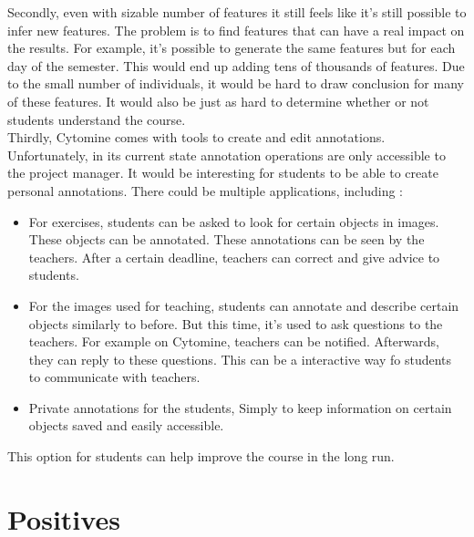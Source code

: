 \documentclass[a4paper,11pt]{report}
\numberwithin{figure}{section} %
\begin{document}
        Secondly, even with sizable number of features it still feels like it's still possible to infer new features.
        The problem is to find features that can have a real impact on the results.
        For example, it's possible to generate the same features but for each day of the semester.
        This would end up adding tens of thousands of features.
        Due to the small number of individuals, it would be hard to draw conclusion for many of these features.
        It would also be just as hard to determine whether or not students understand the course.\\

        Thirdly, Cytomine comes with tools to create and edit annotations.
        Unfortunately, in its current state annotation operations are only accessible to the project manager.
        It would be interesting for students to be able to create personal annotations.
        There could be multiple applications, including :
        \begin{itemize}
            \item[\textbullet] For exercises, students can be asked to look for certain objects in images.
            These objects can be annotated.
            These annotations can be seen by the teachers.
            After a certain deadline, teachers can correct and give advice to students.
            \item[\textbullet] For the images used for teaching, students can annotate and describe certain objects similarly to before.
            But this time, it's used to ask questions to the teachers.
            For example on Cytomine, teachers can be notified.
            Afterwards, they can reply to these questions.
            This can be a interactive way fo students to communicate with teachers.
            \item[\textbullet] Private annotations for the students, Simply to keep information on certain objects saved and easily accessible.
        \end{itemize}
        This option for students can help improve the course in the long run.

    \section{Positives}
\end{document}
